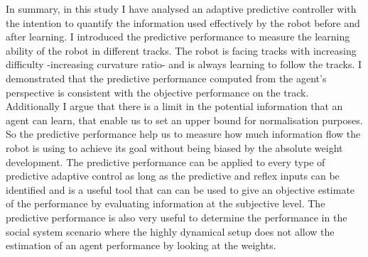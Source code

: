 In summary, in this study I have analysed an adaptive predictive controller
with the intention to quantify the information used effectively by the robot 
before and after learning.
I introduced the predictive performance to measure the learning ability
of the robot in different tracks.
The robot is facing tracks with increasing difficulty -increasing curvature ratio- 
and is always learning to follow the tracks.
I demonstrated that the predictive performance computed from the agent's 
perspective is consistent with the objective performance on the track.
Additionally I argue that there is a limit in the potential information that an agent can learn,
that enable us to set an upper bound for normalisation purposes.
So the predictive performance help us to measure how much information flow 
the robot is using to achieve its goal without being biased by the absolute weight development.
The predictive performance can be applied to every type of predictive adaptive control 
as long as the predictive and reflex inputs can be identified and is a useful tool 
that can can be used to give an objective estimate of the performance by evaluating information at the subjective level.
The predictive performance is also very useful to determine the performance in the
social system scenario where the highly dynamical setup does not allow the estimation
of an agent performance by looking at the weights.



